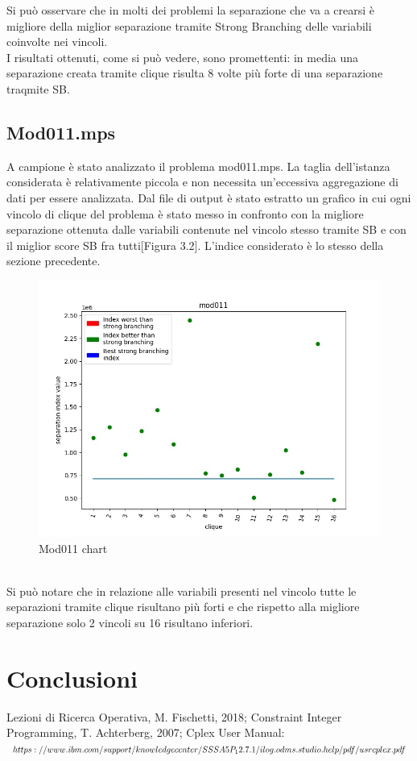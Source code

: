 \documentclass[12pt,a4paper,twoside,openright]{book}
\begin{document}
Si può osservare che in molti dei problemi la separazione che va a crearsi è migliore della miglior separazione 
tramite Strong Branching delle variabili coinvolte nei vincoli. \\
I risultati ottenuti, come si può vedere, sono promettenti: in media una separazione creata tramite clique risulta
8 volte più forte di una separazione traqmite SB. \pagebreak
\section{Mod011.mps}
A campione è stato analizzato il problema mod011.mps. La taglia dell'istanza considerata è relativamente piccola
e non necessita un'eccessiva aggregazione di dati per essere analizzata. Dal file di output è stato estratto un grafico
in cui ogni vincolo di clique del problema è stato messo in confronto con la migliore separazione ottenuta dalle variabili
contenute nel vincolo stesso tramite SB e con il miglior score SB fra tutti[Figura 3.2]. L'indice considerato è lo stesso 
della sezione precedente.\\
\begin{figure}[ht]
    \centering
    \includegraphics [scale = 0.7]{chart_exp1_mod011}
    \caption{Mod011 chart}
    \label{fig:mod011}
\end{figure}\\
Si può notare che in relazione alle variabili presenti nel vincolo tutte le separazioni tramite clique risultano più forti 
e che rispetto alla migliore separazione solo 2 vincoli su 16 risultano inferiori. 
\\
\chapter{Conclusioni}
\renewcommand{\bibname}{Bibliografia/Sitografia}
\begin{thebibliography}{100}
    \bibitem{} Lezioni di Ricerca Operativa, M. Fischetti, 2018;
    \bibitem{} Constraint Integer Programming, T. Achterberg, 2007;
    \bibitem{} Cplex User Manual: \\ 
    $https://www.ibm.com/support/knowledgecenter/SSSA5P_12.7.1/
    \\ilog.odms.studio.help/pdf/usrcplex.pdf$
\end{thebibliography}
\end{document}
